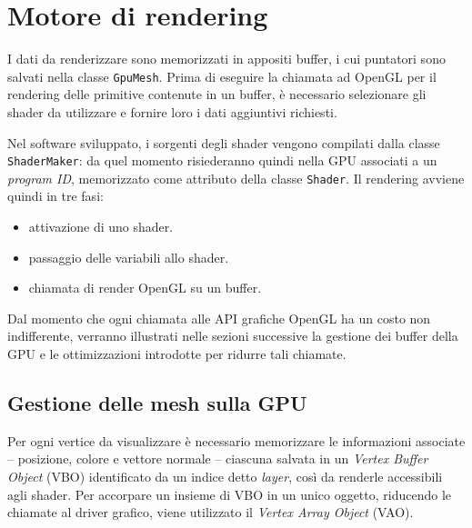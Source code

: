 

%
%
\section{Motore di rendering}
I dati da renderizzare sono memorizzati in appositi buffer, i cui puntatori sono salvati nella classe \texttt{GpuMesh}.
Prima di eseguire la chiamata ad OpenGL per il rendering delle primitive contenute in un buffer, è necessario selezionare gli shader da utilizzare e fornire loro i dati aggiuntivi richiesti.

Nel software sviluppato, i sorgenti degli shader vengono compilati dalla classe \texttt{ShaderMaker}: da quel momento risiederanno quindi nella GPU associati a un \emph{program ID}, memorizzato come attributo della classe \texttt{Shader}.
Il rendering avviene quindi in tre fasi:
\begin{itemize}
    \item attivazione di uno shader.
    \item passaggio delle variabili allo shader.
    \item chiamata di render OpenGL su un buffer.
\end{itemize}

Dal momento che ogni chiamata alle API grafiche OpenGL ha un costo non indifferente, verranno illustrati nelle sezioni successive la gestione dei buffer della GPU e le ottimizzazioni introdotte per ridurre tali chiamate.

\subsection{Gestione delle mesh sulla GPU}
Per ogni vertice da visualizzare è necessario memorizzare le informazioni associate -- posizione, colore e vettore normale -- ciascuna salvata in un \emph{Vertex Buffer Object} (VBO) identificato da un indice detto \emph{layer}, così da renderle accessibili agli shader.
Per accorpare un insieme di VBO in un unico oggetto, riducendo le chiamate al driver grafico, viene utilizzato il \emph{Vertex Array Object} (VAO).


